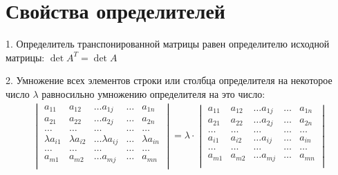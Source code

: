 \documentclass[a4paper,12pt,oneside]{extbook}
\theoremstyle{numbered}
\theoremstyle{unnumbered}
\theoremstyle{named}
\theoremstyle{unnumbered}
\theoremstyle{named}
\theoremstyle{named}
\theoremstyle{named}
\begin{document}
\section{Свойства определителей}%
\label{sec:Свойства определителей}

1. Определитель транспонированной матрицы равен определителю исходной матрицы: \(\det A^T = \det A\)

2. Умножение всех элементов строки или столбца определителя на некоторое число \(\lambda\) равносильно умножению определителя на это число:
\begin{gather*}
    \begin{vmatrix}
        a_{11}         & a_{12}         & \dots a_{1j}         & \dots & a_{1n}         \\
        a_{21}         & a_{22}         & \dots a_{2j}         & \dots & a_{2n}         \\
        \dots          & \dots          & \dots                & \dots & \dots          \\
        \lambda a_{i1} & \lambda a_{i2} & \dots \lambda a_{ij} & \dots & \lambda a_{in} \\
        \dots          & \dots          & \dots                & \dots & \dots          \\
        a_{m1}         & a_{m2}         & \dots a_{mj}         & \dots & a_{mn}         \\
    \end{vmatrix}
    =
    \lambda \cdot
    \begin{vmatrix}
        a_{11} & a_{12} & \dots a_{1j} & \dots & a_{1n} \\
        a_{21} & a_{22} & \dots a_{2j} & \dots & a_{2n} \\
        \dots  & \dots  & \dots        & \dots & \dots  \\
        a_{i1} & a_{i2} & \dots a_{ij} & \dots & a_{in} \\
        \dots  & \dots  & \dots        & \dots & \dots  \\
        a_{m1} & a_{m2} & \dots a_{mj} & \dots & a_{mn} \\
    \end{vmatrix}
\end{gather*}
\end{document}
